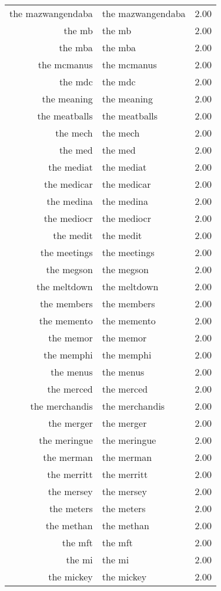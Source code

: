 \begin{table}[ht]
\begin{tabular}{rlr}
  the mazwangendaba & the mazwangendaba & 2.00 \\ 
  the mb & the mb & 2.00 \\ 
  the mba & the mba & 2.00 \\ 
  the mcmanus & the mcmanus & 2.00 \\ 
  the mdc & the mdc & 2.00 \\ 
  the meaning & the meaning & 2.00 \\ 
  the meatballs & the meatballs & 2.00 \\ 
  the mech & the mech & 2.00 \\ 
  the med & the med & 2.00 \\ 
  the mediat & the mediat & 2.00 \\ 
  the medicar & the medicar & 2.00 \\ 
  the medina & the medina & 2.00 \\ 
  the mediocr & the mediocr & 2.00 \\ 
  the medit & the medit & 2.00 \\ 
  the meetings & the meetings & 2.00 \\ 
  the megson & the megson & 2.00 \\ 
  the meltdown & the meltdown & 2.00 \\ 
  the members & the members & 2.00 \\ 
  the memento & the memento & 2.00 \\ 
  the memor & the memor & 2.00 \\ 
  the memphi & the memphi & 2.00 \\ 
  the menus & the menus & 2.00 \\ 
  the merced & the merced & 2.00 \\ 
  the merchandis & the merchandis & 2.00 \\ 
  the merger & the merger & 2.00 \\ 
  the meringue & the meringue & 2.00 \\ 
  the merman & the merman & 2.00 \\ 
  the merritt & the merritt & 2.00 \\ 
  the mersey & the mersey & 2.00 \\ 
  the meters & the meters & 2.00 \\ 
  the methan & the methan & 2.00 \\ 
  the mft & the mft & 2.00 \\ 
  the mi & the mi & 2.00 \\ 
  the mickey & the mickey & 2.00 \\ 

\end{tabular}
\end{table}
